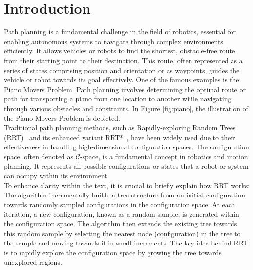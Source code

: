 \documentclass{ctuthesis}
\begin{document}
% 
\maketitle




\chapter{Introduction}
\label{chap:Introduction}
Path planning is a fundamental challenge in the field of robotics, 
essential for enabling autonomous systems to navigate through complex environments efficiently. 
It allows vehicles or robots to find the shortest, 
obstacle-free route from their starting point to their destination.
This route, often represented as a series of states comprising position and orientation or as waypoints, 
guides the vehicle or robot towards its goal effectively. 
One of the famous examples is the Piano Movers Problem.
Path planning involves determining the optimal route or path for transporting a 
piano from one location to another while navigating through various obstacles and constraints. 
In Figure \ref{fig:piano}, the illustration of the Piano Movers Problem is depicted.\\[12pt]
Traditional path planning methods, such as Rapidly-exploring Random Trees (RRT)~\cite{lavalle1998rapidly} 
and its enhanced variant RRT*~\cite{karaman2011rrtstar}, 
have been widely used due to their effectiveness in handling high-dimensional configuration spaces.  
The configuration space, often denoted as $\mathcal{C}$-space, is a fundamental concept in robotics and motion planning. 
It represents all possible configurations or states that a robot or system can occupy within its environment.\\[12pt]
To enhance clarity within the text, it is crucial to briefly explain how RRT works: 
The algorithm incrementally builds a tree structure from an initial configuration towards randomly sampled configurations in the configuration space.
At each iteration, a new configuration, known as a random sample, is generated within the configuration space. 
The algorithm then extends the existing tree towards this random sample by selecting the nearest node (configuration) in the tree to the sample and moving towards it in small increments.
The key idea behind RRT is to rapidly explore the configuration space by growing the tree towards unexplored regions. 
\end{document}
